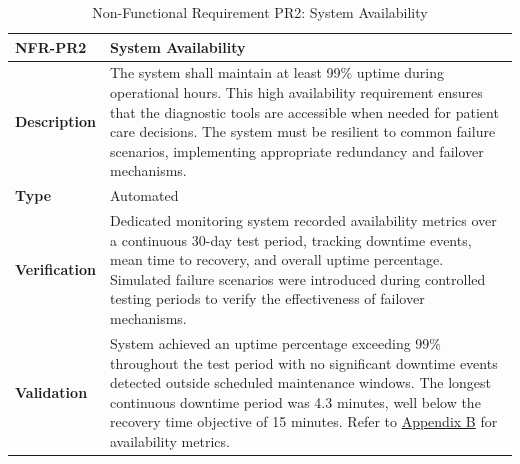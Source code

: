 \documentclass[12pt, titlepage]{article}
\begin{document}
\begin{table}[H]
\centering
{}
\begin{tabular}{|p{3.5cm}|p{11.5cm}|}
\hline
\rowcolor{gray!30}
\textbf{NFR-PR2} & \textbf{System Availability} \\
\hline
\textbf{Description} & The system shall maintain at least 99\% uptime during operational hours. This high availability requirement ensures that the diagnostic tools are accessible when needed for patient care decisions. The system must be resilient to common failure scenarios, implementing appropriate redundancy and failover mechanisms. \\
\hline
\textbf{Type} & Automated \\
\hline
\textbf{Verification} & Dedicated monitoring system recorded availability metrics over a continuous 30-day test period, tracking downtime events, mean time to recovery, and overall uptime percentage. Simulated failure scenarios were introduced during controlled testing periods to verify the effectiveness of failover mechanisms. \\
\hline
\textbf{Validation} & System achieved an uptime percentage exceeding 99\% throughout the test period with no significant downtime events detected outside scheduled maintenance windows. The longest continuous downtime period was 4.3 minutes, well below the recovery time objective of 15 minutes. Refer to \hyperref[appendix:B]{Appendix B} for availability metrics. \\
\hline
\end{tabular}
\caption{Non-Functional Requirement PR2: System Availability}
\end{table}
\end{document}
